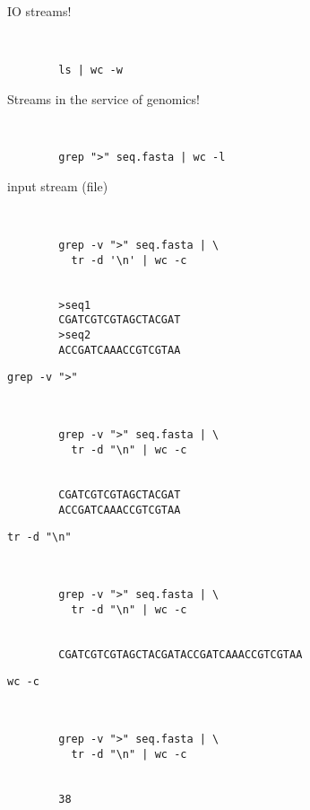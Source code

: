 \documentclass[xcolor=dvipsnames]{beamer}
\begin{document}
\begin{frame}[fragile]
	\huge
	IO streams!
	\Large
	\begin{verbatim}
		
	
		ls | wc -w
	\end{verbatim}
\end{frame}

\begin{frame}[fragile]
	\huge
	Streams in the service of genomics!
	\Large
	\begin{verbatim}
		
	
		grep ">" seq.fasta | wc -l
	\end{verbatim}
\end{frame}

\begin{frame}[fragile]
	\huge
	input stream (file)
	\Large
	\begin{verbatim}
		
	
		grep -v ">" seq.fasta | \
		  tr -d '\n' | wc -c
		
		
		>seq1
		CGATCGTCGTAGCTACGAT
		>seq2
		ACCGATCAAACCGTCGTAA
	\end{verbatim}
\end{frame}

\begin{frame}[fragile]
	\huge
	\verb!grep -v ">"!
	\Large
	\begin{verbatim}
		
	
		grep -v ">" seq.fasta | \
		  tr -d "\n" | wc -c
		
		
		CGATCGTCGTAGCTACGAT
		ACCGATCAAACCGTCGTAA
	\end{verbatim}
\end{frame}

\begin{frame}[fragile]
	\huge
	\verb!tr -d "\n"!
	\Large
	\begin{verbatim}
		
	
		grep -v ">" seq.fasta | \
		  tr -d "\n" | wc -c
		
		
		CGATCGTCGTAGCTACGATACCGATCAAACCGTCGTAA
	\end{verbatim}
\end{frame}

\begin{frame}[fragile]
	\huge
	\verb!wc -c!
	\Large
	\begin{verbatim}
		
	
		grep -v ">" seq.fasta | \
		  tr -d "\n" | wc -c
		
		
		38
	\end{verbatim}
\end{frame}
\end{document}
